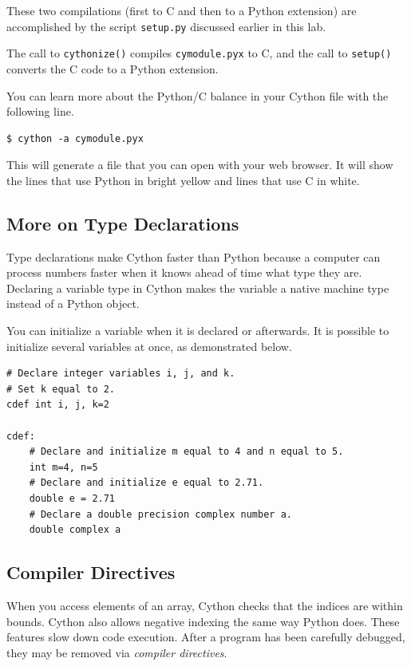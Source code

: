 These two compilations (first to C and then to a Python extension) are accomplished by the script \texttt{setup.py} discussed earlier in this lab.

The call to \texttt{cythonize()} compiles \texttt{cymodule.pyx} to C, and the call to \texttt{setup()} converts the C code to a Python extension.

\begin{info}
You can learn more about the Python/C balance in your Cython file with the following line.
\begin{lstlisting}
$ cython -a cymodule.pyx
\end{lstlisting}
This will generate a  file that you can open with your web browser.
It will show the lines that use Python in bright yellow and lines that use C in white.
\end{info}



\subsection*{More on Type Declarations}
Type declarations make Cython faster than Python because a computer can process numbers faster when it knows ahead of time what type they are.
Declaring a variable type in Cython makes the variable a native machine type instead of a Python object.

You can initialize a variable when it is declared or afterwards.
It is possible to initialize several variables at once, as demonstrated below.

\begin{lstlisting}
# Declare integer variables i, j, and k.
# Set k equal to 2.
cdef int i, j, k=2

cdef:
    # Declare and initialize m equal to 4 and n equal to 5.
    int m=4, n=5
    # Declare and initialize e equal to 2.71.
    double e = 2.71
    # Declare a double precision complex number a.
    double complex a
\end{lstlisting}

\subsection*{Compiler Directives}
When you access elements of an array, Cython checks that the indices are within bounds.
Cython also allows negative indexing the same way Python does.
These features slow down code execution.
After a program has been carefully debugged, they may be removed via \emph{compiler directives}.

